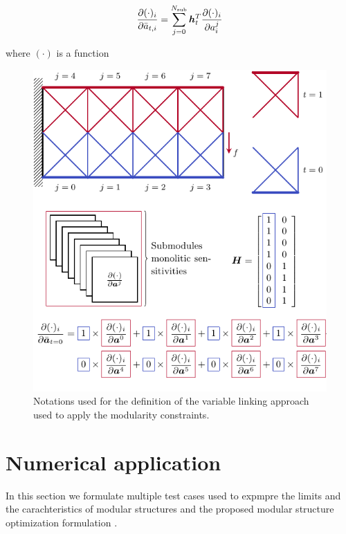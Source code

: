 \begin{equation}
    \frac{\partial(\cdot)_i}{\partial\bar{a}_{t,i}} =  \sum_{j=0}^{N_\text{sub}} \bm{h}_t^T \frac{\partial(\cdot)_i}{\partial a^j_i} 
    \label{eq:05_VL_grad}
\end{equation}

where $(\cdot)$ is a function

\begin{figure}
    \centering
    \includegraphics{figures/05_cellular_opt/00_modules_VL_grad/modules_grad.pdf}
    \caption{Notations used for the definition of the variable linking approach used to apply the modularity constraints.}
    \label{fig:05_VL_grad}
\end{figure}



\section{Numerical application}
In this section we formulate multiple test cases used to expmpre the limits and the carachteristics of modular structures and the proposed modular structure optimization formulation .

